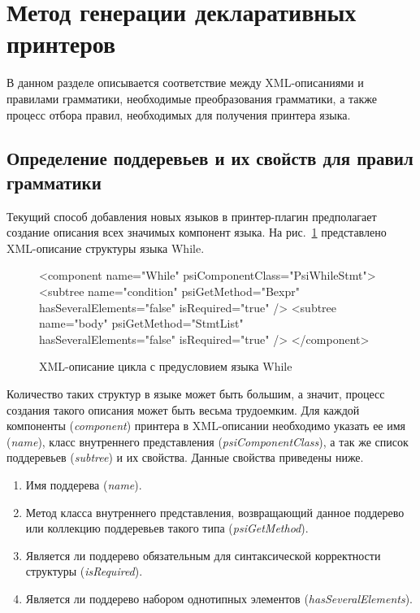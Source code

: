 \section{Метод генерации декларативных принтеров}
\lstset{basicstyle=\normalsize\ttfamily, columns=fullflexible}
В данном разделе описывается соответствие между XML-описаниями \cite{paper:while} и правилами грамматики, необходимые преобразования грамматики, а также процесс отбора правил, необходимых для получения принтера языка.

\subsection{Определение поддеревьев и их свойств для правил грамматики}
Текущий способ добавления новых языков в принтер-плагин предполагает создание описания всех значимых компонент языка.
На рис.~\ref{mth:whileComponent} представлено XML-описание структуры языка While.
\begin{figure}[b]
    \centering
    \begin{pyglist}[language=xml]
        <component name="While" psiComponentClass="PsiWhileStmt">
         <subtree name="condition" psiGetMethod="Bexpr"
             hasSeveralElements="false" isRequired="true" />
         <subtree name="body" psiGetMethod="StmtList"
             hasSeveralElements="false" isRequired="true" />
        </component>
   \end{pyglist}
\caption{XML-описание цикла с предусловием языка While}
\label{mth:whileComponent}
\end{figure}
\noindent
Количество таких структур в языке может быть большим, а значит, процесс создания такого описания может быть весьма трудоемким.
Для каждой компоненты (\emph{component}) принтера в XML-описании необходимо указать ее имя (\emph{name}), класс внутреннего представления (\emph{psiComponentClass}), 
    а так же список поддеревьев (\emph{subtree}) и их свойства.
Данные свойства приведены ниже.%
\begin{enumerate}
    \item Имя поддерева (\emph{name}).
    \item Метод класса внутреннего представления, возвращающий данное поддерево или коллекцию поддеревьев такого типа (\emph{psiGetMethod}).%
    \item Является ли поддерево обязательным для синтаксической корректности структуры (\emph{isRequired}).%
    \item Является ли поддерево набором однотипных элементов (\emph{hasSeveralElements}).%
\end{enumerate}
